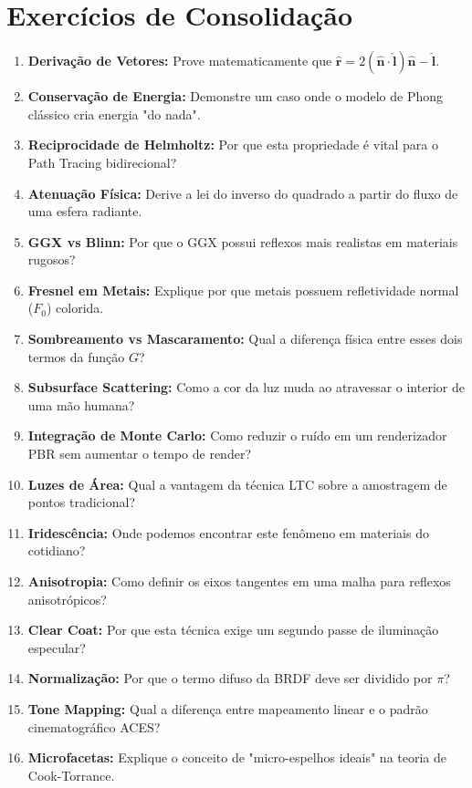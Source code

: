 \section*{Exercícios de Consolidação}

\begin{enumerate}
    \item \textbf{Derivação de Vetores:} Prove matematicamente que $\hat{\mathbf{r}} = 2(\hat{\mathbf{n}} \cdot \hat{\mathbf{l}})\hat{\mathbf{n}} - \hat{\mathbf{l}}$.
    \item \textbf{Conservação de Energia:} Demonstre um caso onde o modelo de Phong clássico cria energia "do nada".
    \item \textbf{Reciprocidade de Helmholtz:} Por que esta propriedade é vital para o Path Tracing bidirecional?
    \item \textbf{Atenuação Física:} Derive a lei do inverso do quadrado a partir do fluxo de uma esfera radiante.
    \item \textbf{GGX vs Blinn:} Por que o GGX possui reflexos mais realistas em materiais rugosos?
    \item \textbf{Fresnel em Metais:} Explique por que metais possuem refletividade normal ($F_0$) colorida.
    \item \textbf{Sombreamento vs Mascaramento:} Qual a diferença física entre esses dois termos da função $G$?
    \item \textbf{Subsurface Scattering:} Como a cor da luz muda ao atravessar o interior de uma mão humana?
    \item \textbf{Integração de Monte Carlo:} Como reduzir o ruído em um renderizador PBR sem aumentar o tempo de render?
    \item \textbf{Luzes de Área:} Qual a vantagem da técnica LTC sobre a amostragem de pontos tradicional?
    \item \textbf{Iridescência:} Onde podemos encontrar este fenômeno em materiais do cotidiano?
    \item \textbf{Anisotropia:} Como definir os eixos tangentes em uma malha para reflexos anisotrópicos?
    \item \textbf{Clear Coat:} Por que esta técnica exige um segundo passe de iluminação especular?
    \item \textbf{Normalização:} Por que o termo difuso da BRDF deve ser dividido por $\pi$?
    \item \textbf{Tone Mapping:} Qual a diferença entre mapeamento linear e o padrão cinematográfico ACES?
    \item \textbf{Microfacetas:} Explique o conceito de "micro-espelhos ideais" na teoria de Cook-Torrance.

\end{enumerate}
